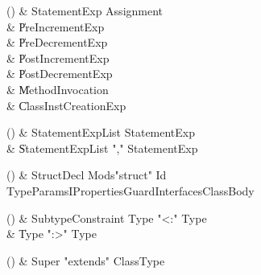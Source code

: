 \begin{bbgrammarappendix}

() & StatementExp \label{prod:StatementExp}  \: Assignment  \\

 &    \| PreIncrementExp \\
 &    \| PreDecrementExp \\
 &    \| PostIncrementExp \\
 &    \| PostDecrementExp \\
 &    \| MethodInvocation \\
 &    \| ClassInstCreationExp \\

\end{bbgrammarappendix}

\begin{bbgrammarappendix}

() & StatementExpList \label{prod:StatementExpList}  \: StatementExp  \\

 &    \| StatementExpList \xcd"," StatementExp \\

\end{bbgrammarappendix}

\begin{bbgrammarappendix}

() & StructDecl \label{prod:StructDecl}  \: Mods\opt \xcd"struct" Id TypeParamsI\opt Properties\opt Guard\opt Interfaces\opt ClassBody  \\


\end{bbgrammarappendix}

\begin{bbgrammarappendix}

() & SubtypeConstraint \label{prod:SubtypeConstraint}  \: Type  \xcd"<:" Type   \\

 &    \| Type  \xcd":>" Type  \\

\end{bbgrammarappendix}

\begin{bbgrammarappendix}

() & Super \label{prod:Super}  \: \xcd"extends" ClassType  \\


\end{bbgrammarappendix}

